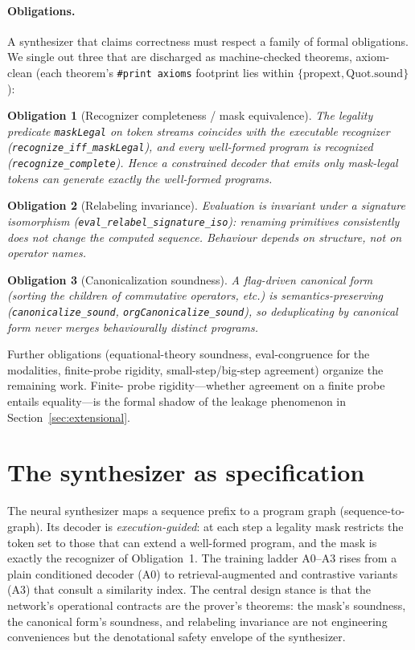 \documentclass[11pt]{article}
\newcommand{\code}[1]{\texttt{#1}}
\newtheorem{obligation}{Obligation}
\begin{document}
\paragraph{Obligations.} A synthesizer that claims correctness must respect a family of
formal obligations. We single out three that are discharged as machine-checked theorems,
axiom-clean (each theorem's \code{\#print axioms} footprint lies within
$\{\text{propext}, \text{Quot.sound}\}$):
\begin{obligation}[Recognizer completeness / mask equivalence]
The legality predicate \code{maskLegal} on token streams coincides with the executable
recognizer (\code{recognize\_iff\_maskLegal}), and every well-formed program is recognized
(\code{recognize\_complete}). Hence a constrained decoder that emits only mask-legal tokens
can generate exactly the well-formed programs.
\end{obligation}
\begin{obligation}[Relabeling invariance]
Evaluation is invariant under a signature isomorphism
(\code{eval\_relabel\_signature\_iso}): renaming primitives consistently does not change the
computed sequence. Behaviour depends on structure, not on operator names.
\end{obligation}
\begin{obligation}[Canonicalization soundness]
A flag-driven canonical form (sorting the children of commutative operators, etc.) is
semantics-preserving (\code{canonicalize\_sound}, \code{orgCanonicalize\_sound}), so
deduplicating by canonical form never merges behaviourally distinct programs.
\end{obligation}
Further obligations (equational-theory soundness, eval-congruence for the modalities,
finite-probe rigidity, small-step/big-step agreement) organize the remaining work. Finite-
probe rigidity---whether agreement on a finite probe entails equality---is the formal
shadow of the leakage phenomenon in Section~\ref{sec:extensional}.

\section{The synthesizer as specification}
\label{sec:synth}

The neural synthesizer maps a sequence prefix to a program graph (sequence-to-graph). Its
decoder is \emph{execution-guided}: at each step a legality mask restricts the token set to
those that can extend a well-formed program, and the mask is exactly the recognizer of
Obligation~1. The training ladder A0--A3 rises from a plain conditioned decoder (A0) to
retrieval-augmented and contrastive variants (A3) that consult a similarity index. The
central design stance is that the network's operational contracts are the prover's
theorems: the mask's soundness, the canonical form's soundness, and relabeling invariance
are not engineering conveniences but the denotational safety envelope of the synthesizer.
\end{document}
